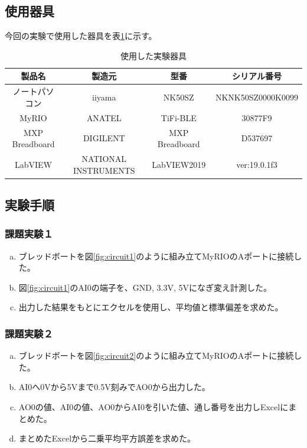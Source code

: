 \documentclass[11pt,dvipdfmx]{jarticle}
\begin{document}
\subsection{使用器具}
今回の実験で使用した器具を表\ref{tab:tools}に示す。
\begin{table}[hbtp]
	\caption{使用した実験器具}
	\label{tab:tools}
	\centering
	\begin{tabular}{|c|c|c|c|}
		\hline
		製品名　& 製造元　& 型番 & シリアル番号\\
		\hline \hline
		ノートパソコン & iiyama &NK50SZ& NKNK50SZ0000K0099\\
		\hline
		MyRIO & ANATEL &TiFi-BLE& 30877F9\\
		\hline
		MXP Breadboard & DIGILENT &MXP Breadboard& D537697\\
		\hline
		LabVIEW & NATIONAL INSTRUMENTS &LabVIEW2019& ver:19.0.1f3\\
		\hline
	\end{tabular}
	
\end{table}

\subsection{実験手順}
	\subsubsection{課題実験１}
		\begin{enumerate}[a.]
			\item ブレッドボートを図\ref{fig:circuit1}のように組み立てMyRIOのAポートに接続した。
			\item 図\ref{fig:circuit1}のAI0の端子を、GND, 3.3V, 5Vになぎ変え計測した。
			\item 出力した結果をもとにエクセルを使用し、平均値と標準偏差を求めた。
		\end{enumerate}

	\subsubsection{課題実験２}
		\begin{enumerate}[a.]
			\item ブレッドボートを図\ref{fig:circuit2}のように組み立てMyRIOのAポートに接続した。
			\item AI0へ0Vから5Vまで0.5V刻みでAO0から出力した。
			\item AO0の値、AI0の値、AO0からAI0を引いた値、通し番号を出力しExcelにまとめた。
			\item まとめたExcelから二乗平均平方誤差を求めた。
		\end{enumerate}
\end{document}
